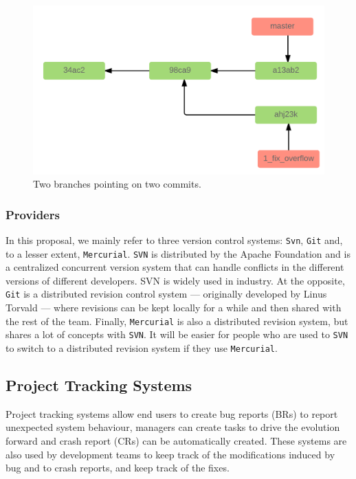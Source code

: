 \begin{figure}[h!]
  \centering
    \includegraphics[scale=0.25]{media/merge.png}
    \caption{Two branches pointing on two commits.
    \label{fig:merge}}
\end{figure}


\subsubsection{Providers\label{sec:revision-provider}}

In this proposal, we mainly refer to three version control systems: {\tt Svn}, {\tt Git} and, to a lesser extent, {\tt Mercurial}.
{\tt SVN} is distributed by the Apache Foundation and is a centralized concurrent version system that can handle conflicts in the different versions of different developers. SVN  is widely used in industry.
At the opposite, {\tt Git} is a distributed revision control system --- originally developed by Linus Torvald --- where revisions can be kept locally for a while and then shared with the rest of the team.
Finally, {\tt Mercurial} is also a distributed revision system, but shares a lot of concepts with {\tt SVN}.
It will be easier for people who are used to {\tt SVN} to switch to a distributed revision system if they use {\tt Mercurial}.

\subsection{Project Tracking Systems\label{sec:issue-tracking}}

Project tracking systems allow end users to create bug reports (BRs) to report unexpected system behaviour,
managers can create tasks to drive the evolution forward and crash report (CRs) can be automatically created.
These systems are also used by development teams to keep track of the modifications induced by bug and to crash reports, and keep track of the fixes.


